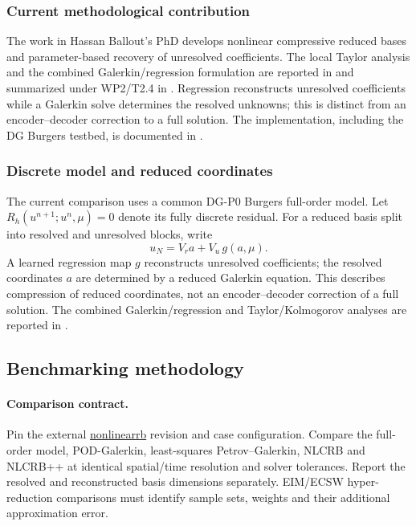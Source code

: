 \subsubsection{Current methodological contribution}
The work in Hassan Ballout's PhD develops nonlinear compressive reduced
bases and parameter-based recovery of unresolved coefficients. The local
Taylor analysis and the combined Galerkin/regression formulation are
reported in \cite{hal_05466017,hal_05143191} and summarized under WP2/T2.4
in . Regression reconstructs unresolved
coefficients while a Galerkin solve determines the resolved unknowns;
this is distinct from an encoder--decoder correction to a full solution.
The implementation, including the DG Burgers testbed, is documented in
.


\subsubsection{Discrete model and reduced coordinates}
The current comparison uses a common DG-P0 Burgers full-order model. Let
$R_h(u^{n+1};u^n,\mu)=0$ denote its fully discrete residual. For a reduced
basis split into resolved and unresolved blocks, write
\[
 u_N=V_r a+V_u\,g(a,\mu).
\]
A learned regression map $g$ reconstructs unresolved coefficients; the resolved
coordinates $a$ are determined by a reduced Galerkin equation. This describes
compression of reduced coordinates, not an encoder--decoder correction of a
full solution. The combined Galerkin/regression and Taylor/Kolmogorov analyses
are reported in \cite{hal_05143191,hal_05466017}.

\subsection{Benchmarking methodology}
\paragraph{Comparison contract.}
Pin the external \href{https://github.com/feelpp/nonlinearrb}{nonlinearrb}
revision and case configuration. Compare the full-order model, POD-Galerkin,
least-squares Petrov--Galerkin, NLCRB and NLCRB++ at identical spatial/time
resolution and solver tolerances. Report the resolved and reconstructed
basis dimensions separately. EIM/ECSW hyper-reduction comparisons must identify
sample sets, weights and their additional approximation error.


